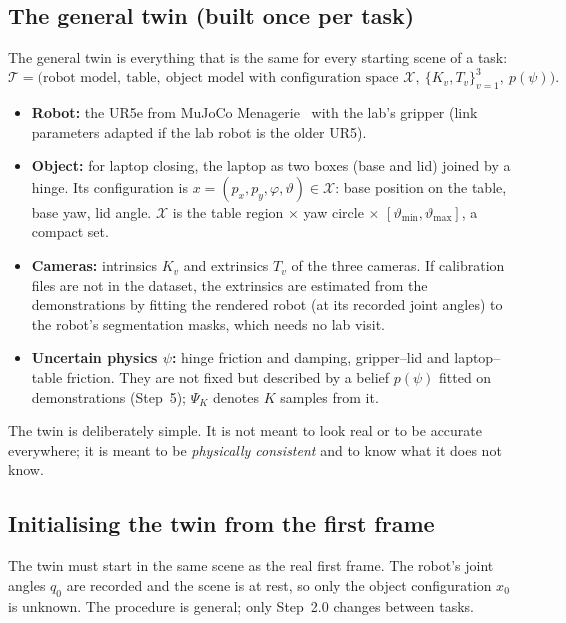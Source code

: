 \documentclass[11pt,a4paper]{article}
\theoremstyle{plain}
\theoremstyle{definition}
\theoremstyle{remark}
\newcommand{\X}{\mathcal X}
\begin{document}
\subsection{The general twin (built once per task)}\label{sec:twin}
The general twin is everything that is the same for every starting scene of a task:
\begin{equation}
\mathcal T=\big(\text{robot model},\ \text{table},\ \text{object model with configuration space }\X,\ \{K_v,T_v\}_{v=1}^{3},\ p(\psi)\big).
\end{equation}
\begin{itemize}
\item \textbf{Robot:} the UR5e from MuJoCo Menagerie~\cite{menagerie} with the lab's gripper (link parameters adapted if the lab robot is the older UR5).
\item \textbf{Object:} for laptop closing, the laptop as two boxes (base and lid) joined by a hinge. Its configuration is $x=(p_x,p_y,\varphi,\vartheta)\in\X$: base position on the table, base yaw, lid angle. $\X$ is the table region $\times$ yaw circle $\times$ $[\vartheta_{\min},\vartheta_{\max}]$, a compact set.
\item \textbf{Cameras:} intrinsics $K_v$ and extrinsics $T_v$ of the three cameras. If calibration files are not in the dataset, the extrinsics are estimated from the demonstrations by fitting the rendered robot (at its recorded joint angles) to the robot's segmentation masks, which needs no lab visit.
\item \textbf{Uncertain physics $\psi$:} hinge friction and damping, gripper--lid and laptop--table friction. They are not fixed but described by a belief $p(\psi)$ fitted on demonstrations (Step~5); $\Psi_K$ denotes $K$ samples from it.
\end{itemize}
The twin is deliberately simple. It is not meant to look real or to be accurate everywhere; it is meant to be \emph{physically consistent} and to know what it does not know.

\subsection{Initialising the twin from the first frame}\label{sec:init}
The twin must start in the same scene as the real first frame. The robot's joint angles $q_0$ are recorded and the scene is at rest, so only the object configuration $x_0$ is unknown. The procedure is general; only Step~2.0 changes between tasks.
\end{document}
